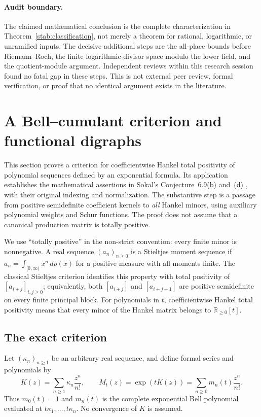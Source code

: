 \documentclass[11pt,a4paper]{article}
\theoremstyle{definition}
\theoremstyle{remark}
\numberwithin{equation}{section}
\begin{document}
\paragraph{Audit boundary.}
The claimed mathematical conclusion is the complete characterization
in Theorem~\ref{stab:classification}, not merely a theorem for rational,
logarithmic, or unramified inputs.  The decisive additional steps are
the all-place bounds before Riemann--Roch, the finite logarithmic-divisor
space modulo the lower field, and the quotient-module argument.
Independent reviews within this research session found no fatal gap in
these steps.  This is not external peer review, formal verification,
or proof that no identical argument exists in the literature.


\section{A Bell--cumulant criterion and functional digraphs}
\label{sec:tp}

This section proves a criterion for coefficientwise Hankel total positivity
of polynomial sequences defined by an exponential formula.  Its application
establishes the mathematical assertions in Sokal's
Conjecture~6.9(b) and~(d) \cite{Sokal2022}, with their original indexing and
normalization.  The substantive step is a passage from positive semidefinite
coefficient kernels to \emph{all} Hankel minors, using auxiliary polynomial
weights and Schur functions.  The proof does not assume that a canonical
production matrix is totally positive.

We use ``totally positive'' in the non-strict convention: every finite minor
is nonnegative.  A real sequence $(a_n)_{n\geq0}$ is a Stieltjes moment
sequence if $a_n=\int_{[0,\infty)}x^n\,d\rho(x)$ for a positive measure
with all moments finite.  The classical Stieltjes criterion identifies this
property with total positivity of $[a_{i+j}]_{i,j\geq0}$; equivalently,
both $[a_{i+j}]$ and $[a_{i+j+1}]$ are positive semidefinite on every
finite principal block.  For polynomials in $t$, coefficientwise Hankel
total positivity means that every minor of the Hankel matrix belongs to
$\mathbb R_{\geq0}[t]$.

\subsection{The exact criterion}

Let $(\kappa_n)_{n\geq1}$ be an arbitrary real sequence, and define formal
series and polynomials by
\begin{equation}
 K(z)=\sum_{n\geq1}\kappa_n\frac{z^n}{n!},
 \qquad
 M_t(z)=\exp(tK(z))=\sum_{n\geq0}m_n(t)\frac{z^n}{n!}.
 \label{eq:tp-bell-definition}
\end{equation}
Thus $m_0(t)=1$ and $m_n(t)$ is the complete exponential Bell polynomial
evaluated at $t\kappa_1,\ldots,t\kappa_n$.  No convergence of $K$ is
assumed.
\end{document}
